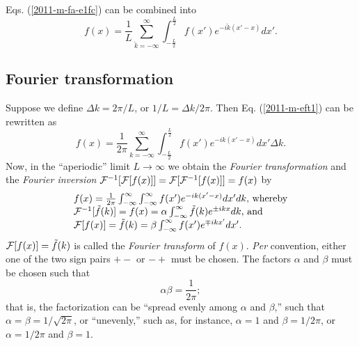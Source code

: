 Eqs. (\ref{2011-m-fa-e1fc}) can be combined into
\begin{equation}
f(x)= \frac{1}{L}\sum _{\check{k}=-\infty}^\infty  \int_{-\frac{L}{2}}^\frac{L}{2} f(x') e^{-i{\check{k}(x'-x)}} dx'
.
\label{2011-m-eft1}
\end{equation}




\subsection{Fourier transformation}

Suppose we define
$\Delta {k} = 2\pi /L$, or $1/L = \Delta {k} /2\pi$.
Then Eq. (\ref{2011-m-eft1}) can be rewritten  as
\begin{equation}
f(x)= \frac{1}{2\pi}
\sum _{k=-\infty}^\infty  \int_{-\frac{L}{2}}^\frac{L}{2} f(x') e^{-i{{k}(x'-x)}} dx' \Delta {k}
.
\end{equation}
Now,
in the ``aperiodic'' limit $L\rightarrow \infty$ we obtain  the {\em Fourier transformation}
and the {\em Fourier inversion}
$
{\cal F}^{-1}[{\cal F} [f(x)]]=
{\cal F} [{\cal F}^{-1}[f(x)]]= f(x)
$
by
\begin{equation}
\begin{array}{l}
f(x)= \frac{1}{2\pi}
 \int_{-\infty}^\infty   \int_{-\infty}^\infty f(x') e^{-i{{k}(x'-x)}} dx' d{k} \textrm{, whereby} \\
  {\cal F}^{-1}[\tilde{f}(k)]=f(x)=  \alpha \int_{-\infty}^\infty \tilde{f}(k) e^{\pm i{kx}} dk \textrm{, and} \\
 {\cal F}[f(x)]=\tilde{f}(k)=  \beta \int_{-\infty}^\infty  f(x') e^{\mp i{kx'}} dx'
.
\end{array}
\label{2011-m-efta}
\end{equation}
$ {\cal F}[f(x)]= \tilde{f}(k)$
is called the {\em Fourier transform}
of $f(x)$.
{\em Per} convention, either one of the two sign pairs $+-$ or $-+$ must be chosen.
The factors $\alpha$ and $\beta$ must be chosen such that
\begin{equation}
 \alpha  \beta    = \frac{1}{2\pi};
\label{2011-m-efta1}
\end{equation}
that is, the factorization can be ``spread evenly among $\alpha$ and $\beta$,''
such that  $\alpha=\beta=1/\sqrt{2\pi}$, or ``unevenly,''
such as, for instance,
 $\alpha=1$ and $\beta=1/ 2\pi $,
or    $\alpha=1/ 2\pi $ and $\beta=1$.


